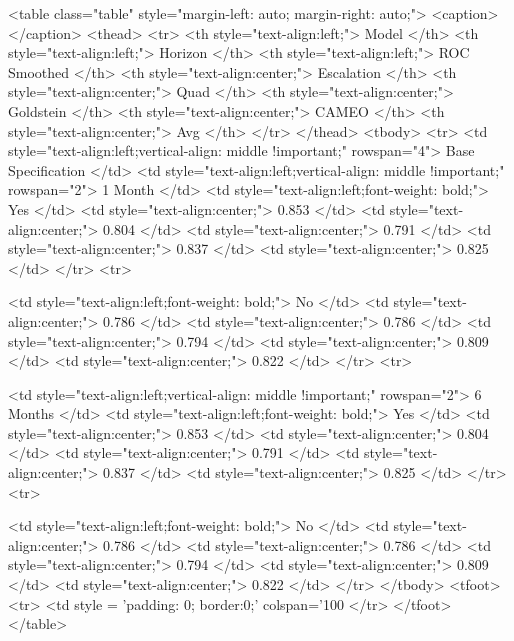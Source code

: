 <table class="table" style="margin-left: auto; margin-right: auto;">
<caption></caption>
 <thead>
  <tr>
   <th style="text-align:left;"> Model </th>
   <th style="text-align:left;"> Horizon </th>
   <th style="text-align:left;"> ROC Smoothed </th>
   <th style="text-align:center;"> Escalation </th>
   <th style="text-align:center;"> Quad </th>
   <th style="text-align:center;"> Goldstein </th>
   <th style="text-align:center;"> CAMEO </th>
   <th style="text-align:center;"> Avg </th>
  </tr>
 </thead>
<tbody>
  <tr>
   <td style="text-align:left;vertical-align: middle !important;" rowspan="4"> Base Specification </td>
   <td style="text-align:left;vertical-align: middle !important;" rowspan="2"> 1 Month </td>
   <td style="text-align:left;font-weight: bold;"> Yes </td>
   <td style="text-align:center;"> 0.853 </td>
   <td style="text-align:center;"> 0.804 </td>
   <td style="text-align:center;"> 0.791 </td>
   <td style="text-align:center;"> 0.837 </td>
   <td style="text-align:center;"> 0.825 </td>
  </tr>
  <tr>
   
   
   <td style="text-align:left;font-weight: bold;"> No </td>
   <td style="text-align:center;"> 0.786 </td>
   <td style="text-align:center;"> 0.786 </td>
   <td style="text-align:center;"> 0.794 </td>
   <td style="text-align:center;"> 0.809 </td>
   <td style="text-align:center;"> 0.822 </td>
  </tr>
  <tr>
   
   <td style="text-align:left;vertical-align: middle !important;" rowspan="2"> 6 Months </td>
   <td style="text-align:left;font-weight: bold;"> Yes </td>
   <td style="text-align:center;"> 0.853 </td>
   <td style="text-align:center;"> 0.804 </td>
   <td style="text-align:center;"> 0.791 </td>
   <td style="text-align:center;"> 0.837 </td>
   <td style="text-align:center;"> 0.825 </td>
  </tr>
  <tr>
   
   
   <td style="text-align:left;font-weight: bold;"> No </td>
   <td style="text-align:center;"> 0.786 </td>
   <td style="text-align:center;"> 0.786 </td>
   <td style="text-align:center;"> 0.794 </td>
   <td style="text-align:center;"> 0.809 </td>
   <td style="text-align:center;"> 0.822 </td>
  </tr>
</tbody>
<tfoot>
<tr>
<td style = 'padding: 0; border:0;' colspan='100%
</tr>
</tfoot>
</table>
